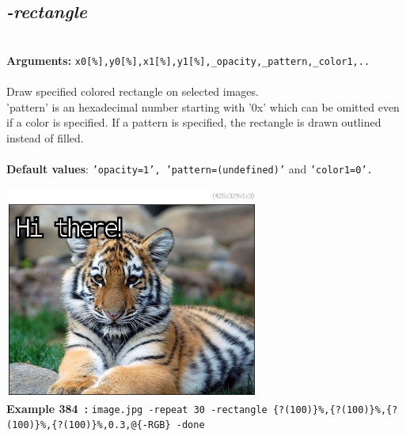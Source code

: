 \documentclass[a4paper,11pt,twoside]{book}
\begin{document}
\subsection{\emph{-rectangle} }\vspace*{-0.5em}
~\\\textbf{Arguments: } 
{\small \texttt{x0[\%],y0[\%],x1[\%],y1[\%],\_opacity,\_pattern,\_color1,..}}\\~\\
Draw specified colored rectangle on selected images.
~\\'pattern' is an hexadecimal number starting with '0x' which can be omitted
even if a color is specified. If a pattern is specified, the rectangle is
drawn outlined instead of filled.
~\\~\\\textbf{Default values}: {\small \texttt{'opacity=1', 'pattern=(undefined)'} and \texttt{'color1=0'.}}
\begin{center}\includegraphics[keepaspectratio=true,height=7cm,width=\textwidth]{img/gmic_def384.jpg}\\
{\footnotesize \textbf{Example 384~:} \texttt{image.jpg -repeat 30 -rectangle \{?(100)\}\%,\{?(100)\}\%,\{?(100)\}\%,\{?(100)\}\%,0.3,@\{-RGB\} -done}}
\end{center}
\end{document}
